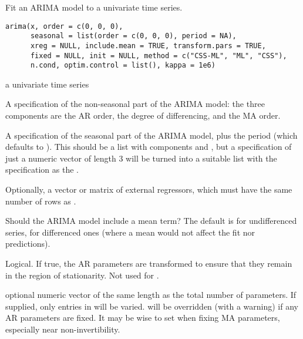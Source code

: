 \begin{Description}\relax
Fit an ARIMA model to a univariate time series.
\end{Description}
\begin{Usage}
\begin{verbatim}
arima(x, order = c(0, 0, 0),
      seasonal = list(order = c(0, 0, 0), period = NA),
      xreg = NULL, include.mean = TRUE, transform.pars = TRUE,
      fixed = NULL, init = NULL, method = c("CSS-ML", "ML", "CSS"),
      n.cond, optim.control = list(), kappa = 1e6)
\end{verbatim}
\end{Usage}
\begin{Arguments}
\begin{ldescription}
\item[\code{x}] a univariate time series
\item[\code{order}] A specification of the non-seasonal part of the ARIMA
model: the three components  are the AR order, the
degree of differencing, and the MA order.
\item[\code{seasonal}] A specification of the seasonal part of the ARIMA
model, plus the period (which defaults to ).
This should be a list with components  and
, but a specification of just a numeric vector of
length 3 will be turned into a suitable list with the specification
as the .
\item[\code{xreg}] Optionally, a vector or matrix of external regressors,
which must have the same number of rows as .
\item[\code{include.mean}] Should the ARIMA model include
a mean term? The default is  for undifferenced series,
 for differenced ones (where a mean would not affect
the fit nor predictions).
\item[\code{transform.pars}] Logical.  If true, the AR parameters are
transformed to ensure that they remain in the region of
stationarity.  Not used for .
\item[\code{fixed}] optional numeric vector of the same length as the total
number of parameters.  If supplied, only  entries in
 will be varied.  
will be overridden (with a warning) if any AR parameters are fixed.
It may be wise to set  when fixing
MA parameters, especially near non-invertibility.


\end{ldescription}
\end{Arguments}

